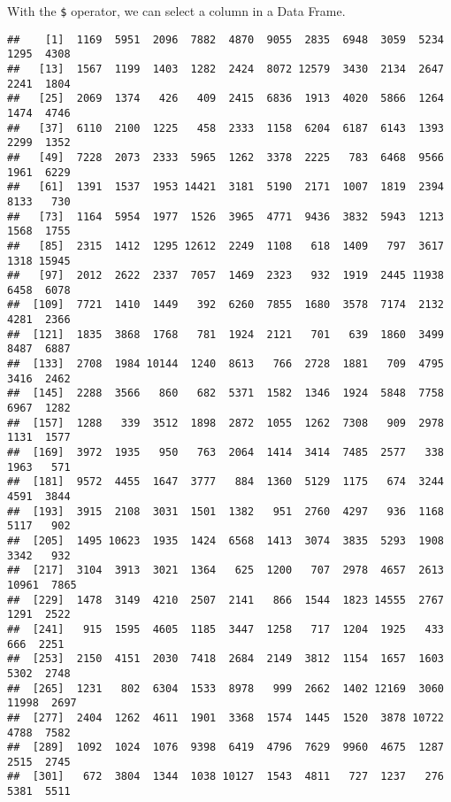 \documentclass[
]{article}
\newenvironment{Shaded}{\begin{snugshade}}{\end{snugshade}}
\newcommand{\NormalTok}[1]{#1}
\newcommand{\SpecialCharTok}[1]{\textcolor[rgb]{0.00,0.00,0.00}{#1}}
\begin{document}
With the \texttt{\$} operator, we can select a column in a Data Frame.

\begin{Shaded}
\end{Shaded}

\begin{verbatim}
##    [1]  1169  5951  2096  7882  4870  9055  2835  6948  3059  5234  1295  4308
##   [13]  1567  1199  1403  1282  2424  8072 12579  3430  2134  2647  2241  1804
##   [25]  2069  1374   426   409  2415  6836  1913  4020  5866  1264  1474  4746
##   [37]  6110  2100  1225   458  2333  1158  6204  6187  6143  1393  2299  1352
##   [49]  7228  2073  2333  5965  1262  3378  2225   783  6468  9566  1961  6229
##   [61]  1391  1537  1953 14421  3181  5190  2171  1007  1819  2394  8133   730
##   [73]  1164  5954  1977  1526  3965  4771  9436  3832  5943  1213  1568  1755
##   [85]  2315  1412  1295 12612  2249  1108   618  1409   797  3617  1318 15945
##   [97]  2012  2622  2337  7057  1469  2323   932  1919  2445 11938  6458  6078
##  [109]  7721  1410  1449   392  6260  7855  1680  3578  7174  2132  4281  2366
##  [121]  1835  3868  1768   781  1924  2121   701   639  1860  3499  8487  6887
##  [133]  2708  1984 10144  1240  8613   766  2728  1881   709  4795  3416  2462
##  [145]  2288  3566   860   682  5371  1582  1346  1924  5848  7758  6967  1282
##  [157]  1288   339  3512  1898  2872  1055  1262  7308   909  2978  1131  1577
##  [169]  3972  1935   950   763  2064  1414  3414  7485  2577   338  1963   571
##  [181]  9572  4455  1647  3777   884  1360  5129  1175   674  3244  4591  3844
##  [193]  3915  2108  3031  1501  1382   951  2760  4297   936  1168  5117   902
##  [205]  1495 10623  1935  1424  6568  1413  3074  3835  5293  1908  3342   932
##  [217]  3104  3913  3021  1364   625  1200   707  2978  4657  2613 10961  7865
##  [229]  1478  3149  4210  2507  2141   866  1544  1823 14555  2767  1291  2522
##  [241]   915  1595  4605  1185  3447  1258   717  1204  1925   433   666  2251
##  [253]  2150  4151  2030  7418  2684  2149  3812  1154  1657  1603  5302  2748
##  [265]  1231   802  6304  1533  8978   999  2662  1402 12169  3060 11998  2697
##  [277]  2404  1262  4611  1901  3368  1574  1445  1520  3878 10722  4788  7582
##  [289]  1092  1024  1076  9398  6419  4796  7629  9960  4675  1287  2515  2745
##  [301]   672  3804  1344  1038 10127  1543  4811   727  1237   276  5381  5511

\end{verbatim}
\end{document}
